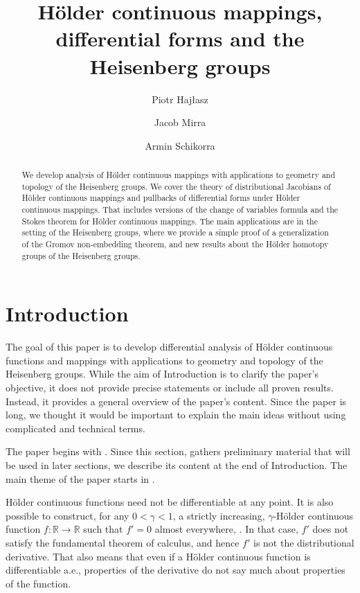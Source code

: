 \documentclass[intlimits,12pt,reqno]{amsart}
\title[H\"older continuous mappings]{H\"older continuous mappings, differential forms and the Heisenberg groups}
\author[Haj\l{}asz]{Piotr Haj\l{}asz}
\author[Mirra]{Jacob Mirra}
\author[Schikorra]{Armin Schikorra}
\newcommand{\R}{\mathbb R}
\numberwithin{equation}{section}
\theoremstyle{definition}
\begin{document}
\sloppy

\begin{abstract}
We develop analysis of H\"older continuous mappings with applications to geometry and topology of the Heisenberg groups. We cover the theory of distributional Jacobians of H\"older continuous mappings and pullbacks of differential forms under H\"older continuous mappings. That includes versions of the change of variables formula and the Stokes theorem for H\"older continuous mappings. The main applications are in the setting of the Heisenberg groups, where we
provide a simple proof of a generalization of the Gromov non-embedding theorem, and new results about the H\"older homotopy groups of the Heisenberg groups.
\end{abstract}

\maketitle
\tableofcontents

\section{Introduction}
\label{S1}
The goal of this paper is to develop differential analysis of H\"older continuous functions and mappings with applications to geometry and topology of the Heisenberg groups. 
While the aim of Introduction is to clarify the paper's objective, it does not provide precise statements or include all proven results. Instead, it provides a general overview of the paper's content.
Since the paper is long, we thought it would be important to explain the main ideas without using complicated and technical terms.

The paper begins with . Since this section, gathers preliminary material that will be used in later sections, we describe its content at the end of Introduction. The main theme of the paper starts in .




H\"older continuous functions need not be differentiable at any point. It is also possible to construct, for any $0<\gamma<1$, a strictly increasing, $\gamma$-H\"older continuous function $f:\R\to\R$ such that $f'=0$ almost everywhere,  \cite{salem}. In that case, $f'$ does not satisfy the fundamental theorem of calculus, and hence $f'$ is not the distributional derivative. That also means that even if a H\"older continuous function is differentiable a.e., properties of the derivative do not say much about properties of the function.
\end{document}
